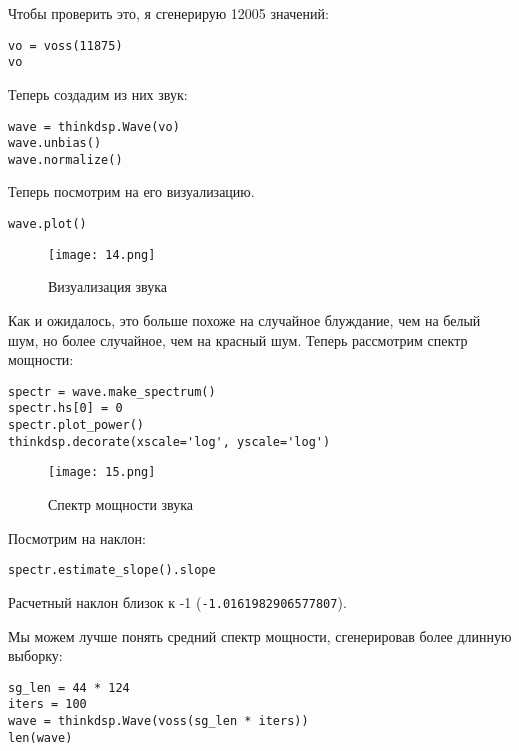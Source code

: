 \documentclass[a4paper,12pt]{report}
\begin{document}
Чтобы проверить это, я сгенерирую 12005 значений:

\begin{lstlisting}[caption=Генерация значений]
vo = voss(11875)
vo
\end{lstlisting}

Теперь создадим из них звук:

\begin{lstlisting}[caption=Создание звука]
wave = thinkdsp.Wave(vo)
wave.unbias()
wave.normalize()
\end{lstlisting}

Теперь посмотрим на его визуализацию.

\begin{lstlisting}[caption=Визуализация звука]
wave.plot()
\end{lstlisting}

\begin{figure}[H]
        \centering
        \texttt{[image: 14.png]}
        \caption{Визуализация звука}
        \label{fig:lab4_fig5_1}
\end{figure}

Как и ожидалось, это больше похоже на случайное блуждание, чем на белый шум, но более случайное, чем на красный шум. Теперь рассмотрим спектр мощности:

\begin{lstlisting}[caption=Спектр мощности звука]
spectr = wave.make_spectrum()
spectr.hs[0] = 0
spectr.plot_power()
thinkdsp.decorate(xscale='log', yscale='log')
\end{lstlisting}

\begin{figure}[H]
        \centering
        \texttt{[image: 15.png]}
        \caption{Спектр мощности звука}
        \label{fig:lab4_fig5_2}
\end{figure}

Посмотрим на наклон:

\begin{lstlisting}[caption=Наклон прямой]
spectr.estimate_slope().slope
\end{lstlisting}

Расчетный наклон близок к -1 (\texttt{-1.0161982906577807}).

Мы можем лучше понять средний спектр мощности, сгенерировав более длинную выборку:

\begin{lstlisting}[caption=Генерация более длинной выборки]
sg_len = 44 * 124
iters = 100
wave = thinkdsp.Wave(voss(sg_len * iters))
len(wave)
\end{lstlisting}
\end{document}
